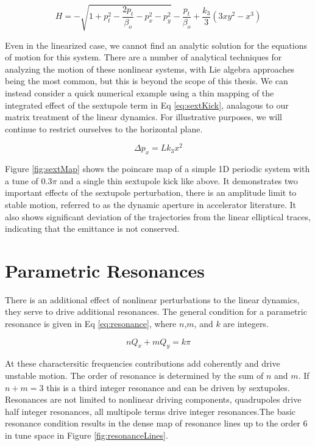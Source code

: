 \begin{equation} \label{eq:H_sext}
	H = -\sqrt{1 + p_t^2 - \frac{2p_t}{\beta_o} - p_x^2 - p_y^2} - \frac{p_t}{\beta_o} + \frac{k_3}{3}(3 x y^2 - x^3)
\end{equation}

Even in the linearized case, we cannot find an analytic solution for the equations of motion for this system. There are a number of analytical techniques for analyzing the motion of these nonlinear systems, with Lie algebra approaches being the most common, but this is beyond the scope of this thesis. We can instead consider a quick numerical example using a thin mapping of the integrated effect of the sextupole term in Eq \ref{eq:sextKick}, analagous to our matrix treatment of the linear dynamics. For illustrative purposes, we will continue to restrict ourselves to the horizontal plane.

\begin{equation} \label{eq:sextKick}
	\Delta p_x = Lk_3x^2
\end{equation}

Figure \ref{fig:sextMap} shows the poincare map of a simple 1D periodic system with a tune of 0.3$\pi$ and a single thin sextupole kick like above. It demonstrates two important effects of the sextupole perturbation, there is an amplitude limit to stable motion, referred to as the dynamic aperture in accelerator literature. It also shows significant deviation of the trajectories from the linear elliptical traces, indicating that the emittance is not conserved.

\section{Parametric Resonances} \label{sec:resonances}
There is an additional effect of nonlinear perturbations to the linear dynamics, they serve to drive additional resonances. The general condition for a parametric resonance is given in Eq \ref{eq:resonance}, where $n$,$m$, and $k$ are integers.

\begin{equation} \label{eq:resonance}
	nQ_x + mQ_y = k\pi
\end{equation}

At these charactersitic frequencies contributions add coherently and drive unstable motion. The order of resonance is determined by the sum of $n$ and $m$. If $n + m = 3$ this is a third integer resonance and can be driven by sextupoles. Resonances are not limited to nonlinear driving components, quadrupoles drive half integer resonances, all multipole terms drive integer resonances.The basic resonance condition results in the dense map of resonance lines up to the order 6 in tune space in Figure \ref{fig:resonanceLines}. 

